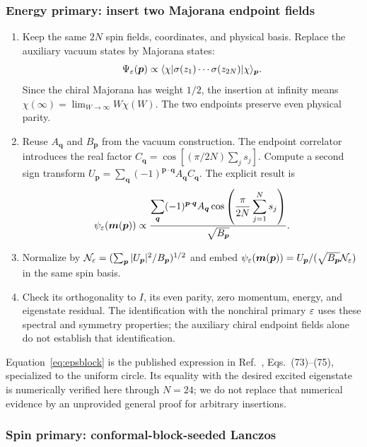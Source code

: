 \subsubsection{Energy primary: insert two Majorana endpoint fields}
\begin{enumerate}
\item Keep the same $2N$ spin fields, coordinates, and physical basis.
Replace the auxiliary vacuum states by Majorana states:
\begin{equation}
 \Psi_\varepsilon(\bm p)\propto
 \langle\chi|\sigma(z_1)\cdots\sigma(z_{2N})|\chi\rangle_{\bm p}.
\end{equation}
Since the chiral Majorana has weight $1/2$, the insertion at infinity
means $\chi(\infty)=\lim_{W\to\infty}W\chi(W)$.
The two endpoints preserve even physical parity.
\item Reuse $A_{\bm q}$ and $B_{\bm p}$ from the vacuum construction.
The endpoint correlator introduces the real factor
$C_{\bm q}=\cos[(\pi/2N)\sum_j s_j]$. Compute a second sign transform
$U_{\bm p}=\sum_{\bm q}(-1)^{\bm p\cdot\bm q}A_{\bm q}C_{\bm q}$.
The explicit result is
\begin{equation}
 \psi_\varepsilon(\bm m(\bm p))\propto
 \frac{\displaystyle\sum_{\bm q}(-1)^{\bm p\cdot\bm q}A_{\bm q}
 \cos\left(\frac\pi{2N}\sum_{j=1}^Ns_j\right)}{\sqrt{B_{\bm p}}}.
\label{eq:epsblock}
\end{equation}
\item Normalize by
$\mathcal N_\varepsilon=(\sum_{\bm p}|U_{\bm p}|^2/B_{\bm p})^{1/2}$
and embed $\psi_\varepsilon(\bm m(\bm p))=U_{\bm p}/(\sqrt{B_{\bm p}}\mathcal N_\varepsilon)$
in the same spin basis.
\item Check its orthogonality to $I$, its even parity, zero momentum,
energy, and eigenstate residual. The identification with the nonchiral
primary $\varepsilon$ uses these spectral and symmetry properties; the
auxiliary chiral endpoint fields alone do not establish that identification.
\end{enumerate}
Equation~\eqref{eq:epsblock} is the published expression in
Ref.~\cite{Montes2017}, Eqs.~(73)--(75), specialized to the uniform
circle. Its equality with the desired excited eigenstate is numerically
verified here through $N=24$; we do not replace that numerical evidence
by an unprovided general proof for arbitrary insertions.

\subsubsection{Spin primary: conformal-block-seeded Lanczos}

